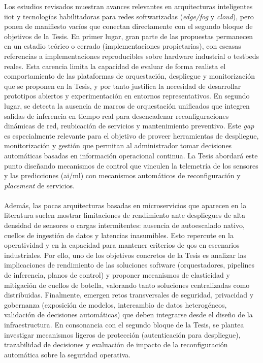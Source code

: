 Los estudios revisados muestran avances relevantes en arquitecturas inteligentes \gls{iiot} y tecnologías habilitadoras para redes softwarizadas (\textit{edge/fog} y \textit{cloud}), pero ponen de manifiesto vacíos que conectan directamente con el segundo bloque de objetivos de la Tesis. En primer lugar, gran parte de las propuestas permanecen en un estadio teórico o cerrado (implementaciones propietarias), con escasas referencias a implementaciones reproducibles sobre hardware industrial o testbeds reales. Esta carencia limita la capacidad de evaluar de forma realista el comportamiento de las plataformas de orquestación, despliegue y monitorización que se proponen en la Tesis, y por tanto justifica la necesidad de desarrollar prototipos abiertos y experimentación en entornos representativos. En segundo lugar, se detecta la ausencia de marcos de orquestación unificados que integren salidas de inferencia en tiempo real para desencadenar reconfiguraciones dinámicas de red, reubicación de servicios y mantenimiento preventivo. Este \textit{gap} es especialmente relevante para el objetivo de proveer herramientas de despliegue, monitorización y gestión que permitan al administrador tomar decisiones automáticas basadas en información operacional continua. La Tesis abordará este punto diseñando mecanismos de control que vinculen la telemetría  de los sensores y las predicciones (\gls{ai}/\gls{ml}) con mecanismos automáticos de reconfiguración y \textit{placement} de servicios.\\
\\
Además, las pocas arquitecturas basadas en microservicios que aparecen en la literatura suelen mostrar limitaciones de rendimiento ante despliegues de alta densidad de sensores o cargas intermitentes: ausencia de autoescalado nativo, cuellos de ingestión de datos y latencias inasumibles. Esto repercute en la operatividad y en la capacidad para mantener criterios de \gls{qos} en escenarios industriales. Por ello, uno de los objetivos concretos de la Tesis es analizar las implicaciones de rendimiento de las soluciones software (orquestadores, pipelines de inferencia, planos de control) y proponer mecanismos de elasticidad y mitigación de cuellos de botella, valorando tanto soluciones centralizadas como distribuidas. Finalmente, emergen retos transversales de seguridad, privacidad y gobernanza (exposición de modelos, intercambio de datos heterogéneos, validación de decisiones automáticas) que deben integrarse desde el diseño de la infraestructura. En consonancia con el segundo bloque de la Tesis, se plantea investigar mecanismos ligeros de protección (autenticación para despliegue), trazabilidad de decisiones y evaluación de impacto de la reconfiguración automática sobre la seguridad operativa.\\
